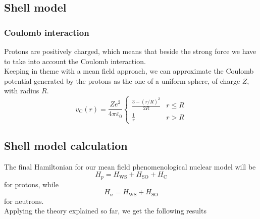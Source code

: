 \subsection{Shell model}
\subsubsection{Coulomb interaction}
Protons are positively charged, which means that beside the strong force we have to take into account the Coulomb interaction.
\\Keeping in theme with a mean field approach, we can approximate the Coulomb potential generated by the protons as the one of a uniform sphere, of charge $Z$, with radius $R$.
\begin{equation}
    v_{\text{C}}(r) = \frac{Ze^2}{4\pi\varepsilon_0} 
    \begin{cases}
        \frac{3-(r/R)^2}{2R} & r \le R \\
        \frac 1 r & r > R
    \end{cases}
\end{equation}
\subsection{Shell model calculation}
The final Hamiltonian for our mean field phenomenological nuclear model will be
\begin{equation}
    H_p = H_\text{WS} + H_\text{SO} + H_\text{C}
\end{equation}
for protons, while
\begin{equation}
    H_n = H_\text{WS} + H_\text{SO} 
\end{equation}
for neutrons.
\\Applying the theory explained so far, we get the following results



